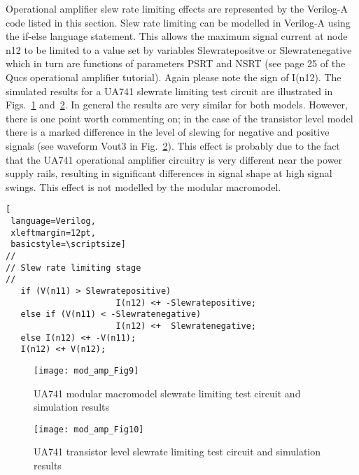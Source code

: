 Operational amplifier slew rate limiting effects are represented by
the Verilog-A code listed in this section.  Slew rate limiting can be
modelled in Verilog-A using the if-else language statement. This
allows the maximum signal current at node n12 to be limited to a value
set by variables Slewratepositve or Slewratenegative which in turn are
functions of parameters PSRT and NSRT (see page 25 of the Qucs
operational amplifier tutorial).  Again please note the sign of
I(n12).  The simulated results for a UA741 slewrate limiting test
circuit are illustrated in Figs.~\ref{fig:mod_amp9}
and~\ref{fig:mod_amp10}. In general the results are very similar for
both models. However, there is one point worth commenting on; in the
case of the transistor level model there is a marked difference in the
level of slewing for negative and positive signals (see waveform Vout3
in Fig.~\ref{fig:mod_amp10}). This effect is probably due to the fact
that the UA741 operational amplifier circuitry is very different near
the power supply rails, resulting in significant differences in signal
shape at high signal swings. This effect is not modelled by the
modular macromodel.

\begin{lstlisting}[
 language=Verilog, 
 xleftmargin=12pt,
 basicstyle=\scriptsize]
//
// Slew rate limiting stage
//
   if (V(n11) > Slewratepositive)
                      I(n12) <+ -Slewratepositive;
   else if (V(n11) < -Slewratenegative)
                      I(n12) <+  Slewratenegative;
   else I(n12) <+ -V(n11);
   I(n12) <+ V(n12);
\end{lstlisting}

\begin{figure} [here]
  \centering
  \texttt{[image: mod\_amp\_Fig9]}
  \caption{UA741 modular macromodel slewrate limiting test circuit and simulation results}
  \label{fig:mod_amp9}
\end{figure} 


\begin{figure} [here]
  \centering
  \texttt{[image: mod\_amp\_Fig10]}
  \caption{UA741 transistor level slewrate limiting test circuit and simulation results}
  \label{fig:mod_amp10}
\end{figure} 




